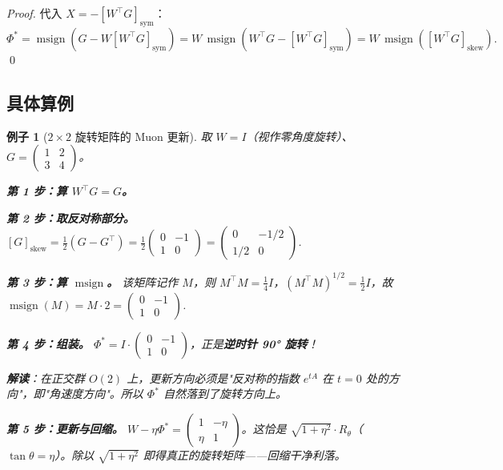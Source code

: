 \documentclass[11pt,a4paper]{article}
\theoremstyle{mythm}
\theoremstyle{mydef}
\newtheorem{example}[theorem]{例子}
\newcommand{\msign}{\operatorname{msign}}
\begin{document}
\begin{proof}
代入 $X = -[W^\top G]_{\mathrm{sym}}$：
$\Phi^\ast = \msign(G - W[W^\top G]_{\mathrm{sym}}) = W\,\msign(W^\top G - [W^\top G]_{\mathrm{sym}}) = W\,\msign([W^\top G]_{\mathrm{skew}}).$
\qed
\end{proof}

\subsection{具体算例}

\begin{example}[$2\times 2$ 旋转矩阵的 Muon 更新]\label{ex:orth-numeric}
取 $W = I$（视作零角度旋转）、$G = \begin{pmatrix}1 & 2\\ 3 & 4\end{pmatrix}$。

\textbf{第 1 步：算 $W^\top G = G$。}

\textbf{第 2 步：取反对称部分。}
$[G]_{\mathrm{skew}} = \tfrac{1}{2}(G - G^\top) = \tfrac{1}{2}\begin{pmatrix}0 & -1\\ 1 & 0\end{pmatrix} = \begin{pmatrix}0 & -1/2\\ 1/2 & 0\end{pmatrix}$.

\textbf{第 3 步：算 $\msign$。}
该矩阵记作 $M$，则 $M^\top M = \tfrac{1}{4}I$，$(M^\top M)^{1/2} = \tfrac{1}{2}I$，故
$\msign(M) = M\cdot 2 = \begin{pmatrix}0 & -1\\ 1 & 0\end{pmatrix}$.

\textbf{第 4 步：组装。}
$\Phi^\ast = I\cdot \begin{pmatrix}0 & -1\\ 1 & 0\end{pmatrix}$，正是\textbf{逆时针 90° 旋转}！

\textbf{解读}：在正交群 $O(2)$ 上，更新方向必须是"反对称的指数 $e^{tA}$ 在 $t=0$ 处的方向"，即"角速度方向"。所以 $\Phi^\ast$ 自然落到了旋转方向上。

\textbf{第 5 步：更新与回缩。}
$W - \eta\Phi^\ast = \begin{pmatrix}1 & -\eta\\ \eta & 1\end{pmatrix}$。这恰是 $\sqrt{1+\eta^2}\cdot R_\theta$（$\tan\theta = \eta$）。除以 $\sqrt{1+\eta^2}$ 即得真正的旋转矩阵——回缩干净利落。
\end{example}
\end{document}
